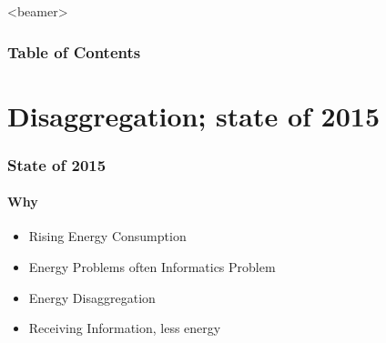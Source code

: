 \documentclass{beamer}              %
\begin{document}


\frame{\titlepage}

\begin{frame}<beamer>
		\frametitle{Table of Contents}
		\tableofcontents[currentsection]
\end{frame}

\section{Disaggregation; state of 2015}


\begin{frame}
\frametitle{State of 2015}
\framesubtitle{Why}
\begin{itemize}
	\item {Rising Energy Consumption}
	\item{Energy Problems often Informatics Problem}
	\item{Energy Disaggregation}
	\item{Receiving Information, less energy}
\end{itemize}


\end{frame}
\end{document}
